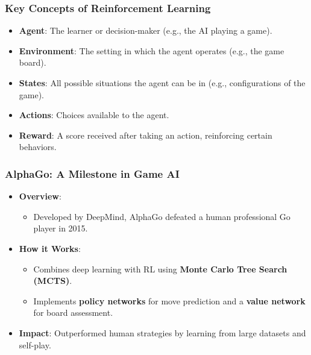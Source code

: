 \documentclass[aspectratio=169]{beamer}
\begin{document}
\begin{frame}[fragile]
    \frametitle{Key Concepts of Reinforcement Learning}
    \begin{itemize}
        \item \textbf{Agent}: The learner or decision-maker (e.g., the AI playing a game).
        \item \textbf{Environment}: The setting in which the agent operates (e.g., the game board).
        \item \textbf{States}: All possible situations the agent can be in (e.g., configurations of the game).
        \item \textbf{Actions}: Choices available to the agent.
        \item \textbf{Reward}: A score received after taking an action, reinforcing certain behaviors.
    \end{itemize}
\end{frame}

\begin{frame}[fragile]
    \frametitle{AlphaGo: A Milestone in Game AI}
    \begin{itemize}
        \item \textbf{Overview}:
        \begin{itemize}
            \item Developed by DeepMind, AlphaGo defeated a human professional Go player in 2015.
        \end{itemize}
        \item \textbf{How it Works}:
        \begin{itemize}
            \item Combines deep learning with RL using \textbf{Monte Carlo Tree Search (MCTS)}.
            \item Implements \textbf{policy networks} for move prediction and a \textbf{value network} for board assessment.
        \end{itemize}
        \item \textbf{Impact}: Outperformed human strategies by learning from large datasets and self-play.
    \end{itemize}
\end{frame}
\end{document}
